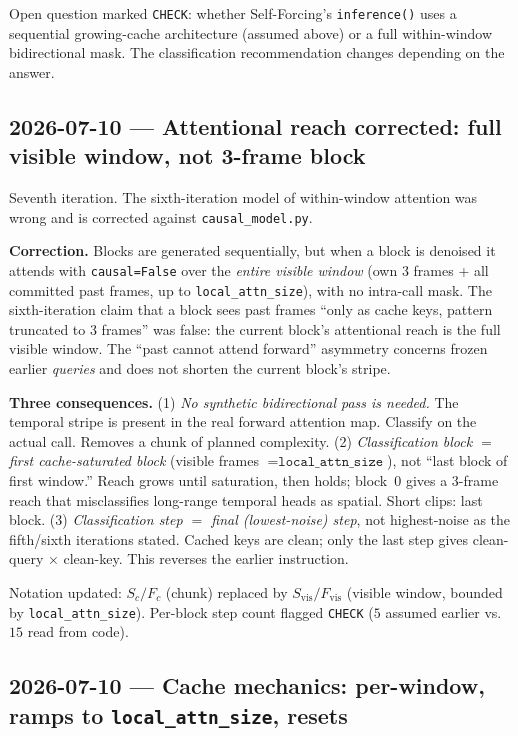 \documentclass{article}
\begin{document}
Open question marked \texttt{CHECK}: whether Self-Forcing's \texttt{inference()}
uses a sequential growing-cache architecture (assumed above) or a full
within-window bidirectional mask. The classification recommendation changes
depending on the answer.

\subsection*{2026-07-10 --- Attentional reach corrected: full visible window, not 3-frame block}

Seventh iteration. The sixth-iteration model of within-window attention was
wrong and is corrected against \texttt{causal\_model.py}.

\textbf{Correction.} Blocks are generated sequentially, but when a block is
denoised it attends with \texttt{causal=False} over the \emph{entire visible
window} (own 3 frames + all committed past frames, up to
\texttt{local\_attn\_size}), with no intra-call mask. The sixth-iteration claim
that a block sees past frames ``only as cache keys, pattern truncated to 3
frames'' was false: the current block's attentional reach is the full visible
window. The ``past cannot attend forward'' asymmetry concerns frozen earlier
\emph{queries} and does not shorten the current block's stripe.

\textbf{Three consequences.}
(1) \emph{No synthetic bidirectional pass is needed.} The temporal stripe is
present in the real forward attention map. Classify on the actual call. Removes
a chunk of planned complexity.
(2) \emph{Classification block $=$ first cache-saturated block} (visible frames
$= \texttt{local\_attn\_size}$), not ``last block of first window.'' Reach grows
until saturation, then holds; block~0 gives a 3-frame reach that misclassifies
long-range temporal heads as spatial. Short clips: last block.
(3) \emph{Classification step $=$ final (lowest-noise) step}, not highest-noise
as the fifth/sixth iterations stated. Cached keys are clean; only the last step
gives clean-query $\times$ clean-key. This reverses the earlier instruction.

Notation updated: $S_c/F_c$ (chunk) replaced by $S_{\mathrm{vis}}/F_{\mathrm{vis}}$
(visible window, bounded by \texttt{local\_attn\_size}). Per-block step count
flagged \texttt{CHECK} ($5$ assumed earlier vs.\ $15$ read from code).

\subsection*{2026-07-10 --- Cache mechanics: per-window, ramps to \texttt{local\_attn\_size}, resets}
\end{document}
